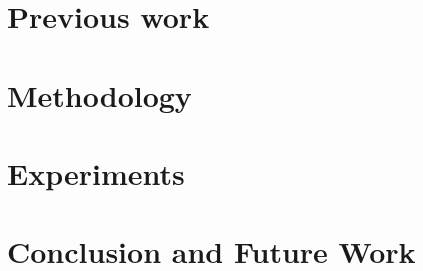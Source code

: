 \documentclass[10pt,twocolumn,letterpaper]{article}
\begin{document}
%

\section{Previous work}
\label{sec_motivtn}



%

%

\section{Methodology}
\label{sec_method}



\section{Experiments}
\label{sec_exp}




\section{Conclusion and Future Work}
\label{sec_con}




{\small


}
\end{document}
